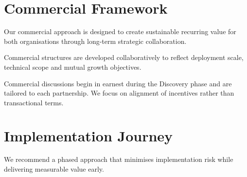 
\section{Commercial Framework}

Our commercial approach is designed to create sustainable recurring value for both organisations through long-term strategic collaboration.

Commercial structures are developed collaboratively to reflect deployment scale, technical scope and mutual growth objectives.

\vspace{4mm}

\begin{partnerbox}

Commercial discussions begin in earnest during the Discovery phase and are tailored to each partnership. We focus on alignment of incentives rather than transactional terms.

\end{partnerbox}


\section{Implementation Journey}

We recommend a phased approach that minimises implementation risk while delivering measurable value early.

\vspace{5mm}

\begin{center}


\end{center}

